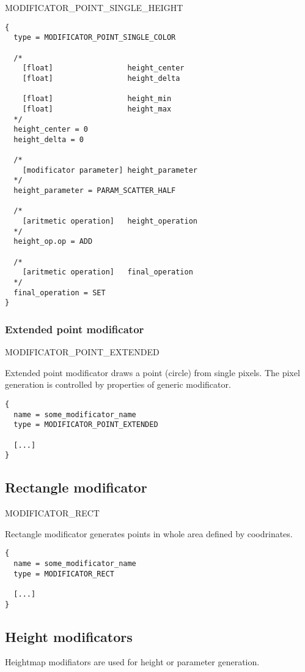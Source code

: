\documentclass[11pt]{article}
\begin{document}
MODIFICATOR\_POINT\_SINGLE\_HEIGHT

\begin{verbatim}
{
  type = MODIFICATOR_POINT_SINGLE_COLOR

  /*    
    [float]                 height_center
    [float]                 height_delta

    [float]                 height_min
    [float]                 height_max
  */
  height_center = 0
  height_delta = 0
  
  /*
    [modificator parameter] height_parameter
  */  
  height_parameter = PARAM_SCATTER_HALF
  
  /*  
    [aritmetic operation]   height_operation
  */
  height_op.op = ADD
  
  /*  
    [aritmetic operation]   final_operation
  */
  final_operation = SET
}
\end{verbatim}

\subsubsection{Extended point modificator}
MODIFICATOR\_POINT\_EXTENDED

Extended point modificator draws a point (circle)
from single pixels. The pixel generation is controlled by 
properties of generic modificator.

\begin{verbatim}
{
  name = some_modificator_name
  type = MODIFICATOR_POINT_EXTENDED
  
  [...]
}
\end{verbatim}

\subsection{Rectangle modificator}
MODIFICATOR\_RECT

Rectangle modificator generates points in whole area defined by coodrinates.

\begin{verbatim}
{
  name = some_modificator_name
  type = MODIFICATOR_RECT
  
  [...]
}
\end{verbatim}

\subsection{Height modificators}

Heightmap modifiators are used for height or parameter generation.
\end{document}
